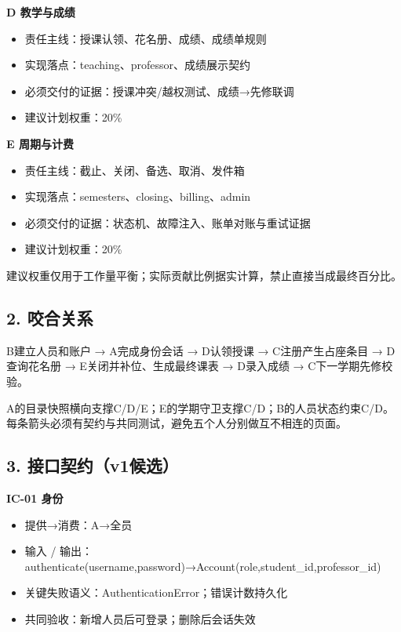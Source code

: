 \documentclass[UTF8,11pt,a4paper]{ctexart}
\providecommand{\tightlist}{\setlength{\itemsep}{0pt}\setlength{\parskip}{0pt}}
\begin{document}
\textbf{D 教学与成绩}

\begin{itemize}
\tightlist
\item
  责任主线：授课认领、花名册、成绩、成绩单规则
\item
  实现落点：teaching、professor、成绩展示契约
\item
  必须交付的证据：授课冲突/越权测试、成绩→先修联调
\item
  建议计划权重：20\%
\end{itemize}

\textbf{E 周期与计费}

\begin{itemize}
\tightlist
\item
  责任主线：截止、关闭、备选、取消、发件箱
\item
  实现落点：semesters、closing、billing、admin
\item
  必须交付的证据：状态机、故障注入、账单对账与重试证据
\item
  建议计划权重：20\%
\end{itemize}

建议权重仅用于工作量平衡；实际贡献比例据实计算，禁止直接当成最终百分比。

\hypertarget{2-ux54acux5408ux5173ux7cfb}{%
\subsection{2. 咬合关系}\label{2-ux54acux5408ux5173ux7cfb}}

B建立人员和账户 → A完成身份会话 → D认领授课 → C注册产生占座条目 →
D查询花名册 → E关闭并补位、生成最终课表 → D录入成绩 →
C下一学期先修校验。

A的目录快照横向支撑C/D/E；E的学期守卫支撑C/D；B的人员状态约束C/D。每条箭头必须有契约与共同测试，避免五个人分别做互不相连的页面。

\hypertarget{3-ux63a5ux53e3ux5951ux7ea6v1ux5019ux9009}{%
\subsection{3.
接口契约（v1候选）}\label{3-ux63a5ux53e3ux5951ux7ea6v1ux5019ux9009}}

\textbf{IC-01 身份}

\begin{itemize}
\tightlist
\item
  提供→消费：A→全员
\item
  输入 /
  输出：authenticate(username,password)→Account(role,student\_\allowbreak{}id,professor\_\allowbreak{}id)
\item
  关键失败语义：AuthenticationError；错误计数持久化
\item
  共同验收：新增人员后可登录；删除后会话失效
\end{itemize}
\end{document}
